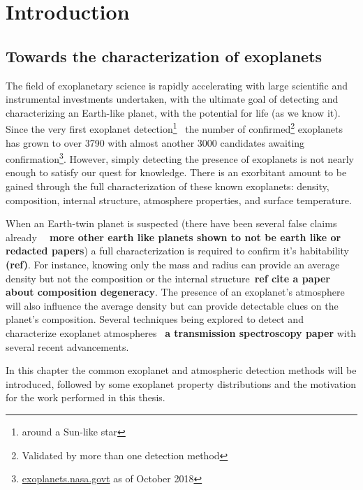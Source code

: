 
\chapter{Introduction}\label{cha:introduction}

\section{Towards the characterization of exoplanets}

The field of exoplanetary science is rapidly accelerating with large scientific and instrumental investments undertaken, with the ultimate goal of detecting and characterizing an Earth-like planet, with the potential for life (as we know it).
Since the very first exoplanet detection\footnote{around a Sun-like star}~\citep{mayor_jupitermass_1995} the number of confirmed\footnote{Validated by more than one detection method} exoplanets has grown to over 3790 with almost another 3000 candidates awaiting confirmation\footnote{\href{https://exoplanets.nasa.gov/}{exoplanets.nasa.govt} as of October 2018}.
However, simply detecting the presence of exoplanets is not nearly enough to satisfy our quest for knowledge.
There is an exorbitant amount to be gained through the full characterization of these known exoplanets: density, composition, internal structure, atmosphere properties, and surface temperature.

When an Earth-twin planet is suspected (there have been several false claims already \textbf{~\citep[e.g.][]{mullally_kepler_2018} \textbf{more} other earth like planets shown to not be earth like or redacted papers}) a full characterization is required to confirm it's habitability \textbf{(ref)}.
For instance, knowing only the mass and radius can provide an average density but not the composition or the internal structure~\textbf{ref cite {a paper about composition degeneracy}}.
The presence of an exoplanet's atmosphere will also influence the average density but can provide detectable clues on the planet's composition.
Several techniques being explored to detect and characterize exoplanet atmospheres~\citep[e.g.][]{snellen_orbital_2010, martins_reflected_2016, piskorz_evidence_2016} \textbf{a transmission spectroscopy paper} with several recent advancements.

In this chapter the common exoplanet and atmospheric detection methods will be introduced, followed by some exoplanet property distributions and the motivation for the work performed in this thesis.\\












